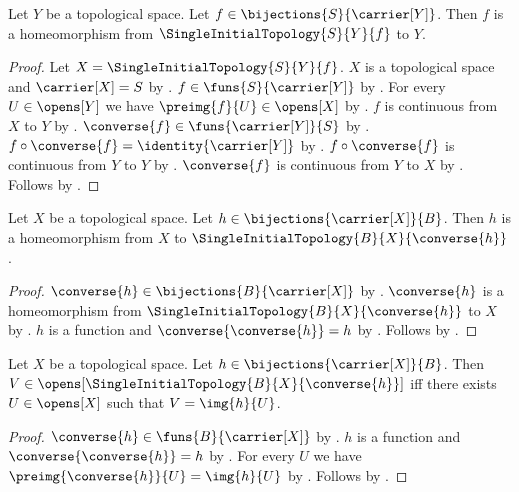 \begin{classification}\label{single_initial_bijection_homeomorphism}
    Let $Y$ be a topological space.
    Let $f\in\bijections{S}{\carrier[Y]}$.
    Then $f$ is a homeomorphism from $\SingleInitialTopology{S}{Y}{f}$ to $Y$.
\end{classification}
\begin{proof}
    Let $X=\SingleInitialTopology{S}{Y}{f}$.
    $X$ is a topological space and $\carrier[X]=S$ by
        .
    $f\in\funs{S}{\carrier[Y]}$ by .
    For every $U\in\opens[Y]$ we have $\preimg{f}{U}\in\opens[X]$ by
        .
    $f$ is continuous from $X$ to $Y$ by .
    $\converse{f}\in\funs{\carrier[Y]}{S}$ by .
    $f\circ\converse{f}=\identity{\carrier[Y]}$ by .
    $f\circ\converse{f}$ is continuous from $Y$ to $Y$ by .
    $\converse{f}$ is continuous from $Y$ to $X$ by
        .
    Follows by .
\end{proof}

\begin{classification}\label{bijection_transported_topology}
    Let $X$ be a topological space.
    Let $h\in\bijections{\carrier[X]}{B}$.
    Then $h$ is a homeomorphism from $X$ to $\SingleInitialTopology{B}{X}{\converse{h}}$.
\end{classification}
\begin{proof}
    $\converse{h}\in\bijections{B}{\carrier[X]}$ by .
    $\converse{h}$ is a homeomorphism from $\SingleInitialTopology{B}{X}{\converse{h}}$ to $X$ by
        .
    $h$ is a function and $\converse{\converse{h}}=h$ by
        .
    Follows by .
\end{proof}

\begin{theorem}\label{bijection_transported_topology_opens}
    Let $X$ be a topological space.
    Let $h\in\bijections{\carrier[X]}{B}$.
    Then $V\in\opens[\SingleInitialTopology{B}{X}{\converse{h}}]$ iff
        there exists $U\in\opens[X]$ such that $V=\img{h}{U}$.
\end{theorem}
\begin{proof}
    $\converse{h}\in\funs{B}{\carrier[X]}$ by .
    $h$ is a function and $\converse{\converse{h}}=h$ by
        .
    For every $U$ we have $\preimg{\converse{h}}{U}=\img{h}{U}$ by
        .
    Follows by .
\end{proof}

